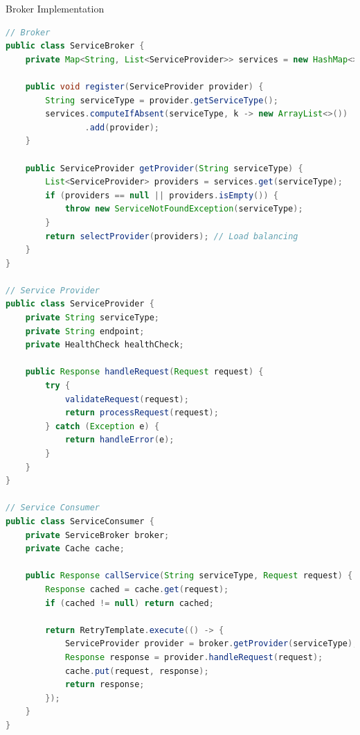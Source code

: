 \begin{example2}{Broker Implementation}
\begin{lstlisting}[language=Java, style=basesmol]
// Broker
public class ServiceBroker {
    private Map<String, List<ServiceProvider>> services = new HashMap<>();
    
    public void register(ServiceProvider provider) {
        String serviceType = provider.getServiceType();
        services.computeIfAbsent(serviceType, k -> new ArrayList<>())
                .add(provider);
    }
    
    public ServiceProvider getProvider(String serviceType) {
        List<ServiceProvider> providers = services.get(serviceType);
        if (providers == null || providers.isEmpty()) {
            throw new ServiceNotFoundException(serviceType);
        }
        return selectProvider(providers); // Load balancing
    }
}

// Service Provider
public class ServiceProvider {
    private String serviceType;
    private String endpoint;
    private HealthCheck healthCheck;
    
    public Response handleRequest(Request request) {
        try {
            validateRequest(request);
            return processRequest(request);
        } catch (Exception e) {
            return handleError(e);
        }
    }
}

// Service Consumer
public class ServiceConsumer {
    private ServiceBroker broker;
    private Cache cache;
    
    public Response callService(String serviceType, Request request) {
        Response cached = cache.get(request);
        if (cached != null) return cached;
        
        return RetryTemplate.execute(() -> {
            ServiceProvider provider = broker.getProvider(serviceType);
            Response response = provider.handleRequest(request);
            cache.put(request, response);
            return response;
        });
    }
}
\end{lstlisting}
\end{example2}

